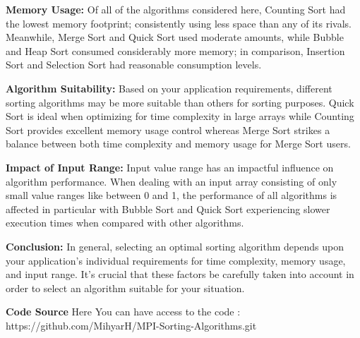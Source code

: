 \documentclass{article}
\begin{document}
\textbf{Memory Usage:} Of all of the algorithms considered here, Counting Sort had the lowest memory footprint; consistently using less space than any of its rivals. Meanwhile, Merge Sort and Quick Sort used moderate amounts, while Bubble and Heap Sort consumed considerably more memory; in comparison, Insertion Sort and Selection Sort had reasonable consumption levels.

\textbf{Algorithm Suitability:} Based on your application requirements, different sorting algorithms may be more suitable than others for sorting purposes. Quick Sort is ideal when optimizing for time complexity in large arrays while Counting Sort provides excellent memory usage control whereas Merge Sort strikes a balance between both time complexity and memory usage for Merge Sort users.

\textbf{Impact of Input Range:} Input value range has an impactful influence on algorithm performance. When dealing with an input array consisting of only small value ranges like between 0 and 1, the performance of all algorithms is affected in particular with Bubble Sort and Quick Sort experiencing slower execution times when compared with other algorithms.

\textbf{Conclusion:} In general, selecting an optimal sorting algorithm depends upon your application's individual requirements for time complexity, memory usage, and input range. It's crucial that these factors be carefully taken into account in order to select an algorithm suitable for your situation.


\textbf{Code Source}
Here You can have access to the code : https://github.com/MihyarH/MPI-Sorting-Algorithms.git













\end{document}
